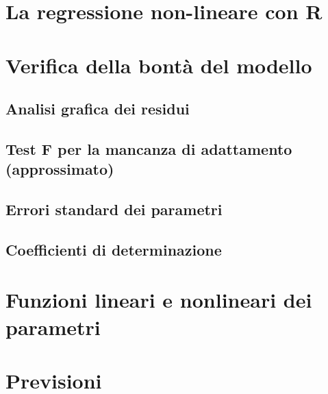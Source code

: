 \documentclass[a4paper,12pt,oneside]{book}
\begin{document}
\hypertarget{la-regressione-non-lineare-con-r}{%
\section{La regressione non-lineare con R}\label{la-regressione-non-lineare-con-r}}

\hypertarget{verifica-della-bontuxe0-del-modello}{%
\section{Verifica della bontà del modello}\label{verifica-della-bontuxe0-del-modello}}

\hypertarget{analisi-grafica-dei-residui-1}{%
\subsection{Analisi grafica dei residui}\label{analisi-grafica-dei-residui-1}}

\hypertarget{test-f-per-la-mancanza-di-adattamento-approssimato}{%
\subsection{Test F per la mancanza di adattamento (approssimato)}\label{test-f-per-la-mancanza-di-adattamento-approssimato}}

\hypertarget{errori-standard-dei-parametri-1}{%
\subsection{Errori standard dei parametri}\label{errori-standard-dei-parametri-1}}

\hypertarget{coefficienti-di-determinazione}{%
\subsection{Coefficienti di determinazione}\label{coefficienti-di-determinazione}}

\hypertarget{funzioni-lineari-e-nonlineari-dei-parametri}{%
\section{Funzioni lineari e nonlineari dei parametri}\label{funzioni-lineari-e-nonlineari-dei-parametri}}

\hypertarget{previsioni-1}{%
\section{Previsioni}\label{previsioni-1}}
\end{document}

